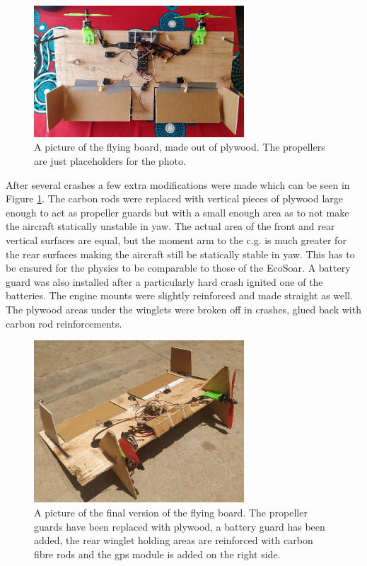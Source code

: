 \documentclass{article}
\begin{document}
\begin{figure}
    \center
    \includegraphics[width=0.7\textwidth]{FlyingBoard.jpg}
    \caption{A picture of the flying board, made out of plywood. The propellers are just placeholders for the photo.}
\end{figure}

After several crashes a few extra modifications were made which can be seen in Figure \ref{fig:finalboard}.
The carbon rods were replaced with vertical pieces of plywood large enough to act as propeller guards but with a small enough area as to not make the aircraft statically unstable in yaw.
The actual area of the front and rear vertical surfaces are equal, but the moment arm to the c.g. is much greater for the rear surfaces making the aircraft still be statically stable in yaw.
This has to be ensured for the physics to be comparable to those of the EcoSoar.
A battery guard was also installed after a particularly hard crash ignited one of the batteries.
The engine mounts were slightly reinforced and made straight as well.
The plywood areas under the winglets were broken off in crashes, glued back with carbon rod reinforcements.

\begin{figure}
    \center
    \includegraphics[width=0.7\textwidth]{plywoodfinal.jpg}
    \caption{A picture of the final version of the flying board. The propeller guards have been replaced with plywood, a battery guard has been added, the rear winglet holding areas are reinforced with carbon fibre rods and the gps module is added on the right side.}
    \label{fig:finalboard}
\end{figure}
\end{document}
